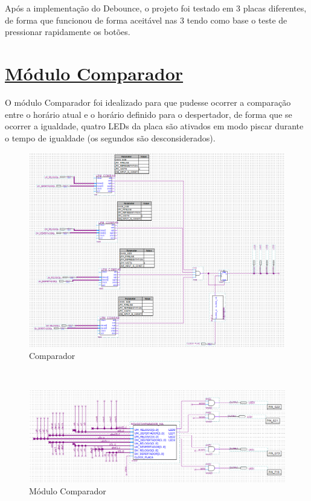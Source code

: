 \documentclass[14pt, oneside]{book}
\newcommand\tab[1][1cm]{\hspace*{#1}}
\theoremstyle{definition}
\begin{document}
                \tab Após a implementação do Debounce, o projeto foi testado em $3$ placas diferentes, de forma que funcionou de forma aceitável nas $3$ tendo como base o teste de pressionar rapidamente os botões.
                
            \section[Módulo Comparador]{\hyperlink{toc}{Módulo Comparador}}
                \tab O módulo Comparador foi idealizado para que pudesse ocorrer a comparação entre o horário atual e o horário definido para o despertador, de forma que se ocorrer a igualdade, quatro LEDs da placa são ativados em modo piscar durante o tempo de igualdade (os segundos são desconsiderados).
                \begin{figure}[!htb]
                    \centering
                    \includegraphics[scale = 0.6]{compare.png}
                    \caption{Comparador}
                    \label{fig:comparador}
                \end{figure} \\
                \begin{figure}[!htb]
                    \centering
                    \includegraphics[scale = 0.6]{compare2.png}
                    \caption{Módulo Comparador}
                    \label{fig:comparador2}
                \end{figure} \\
\end{document}
